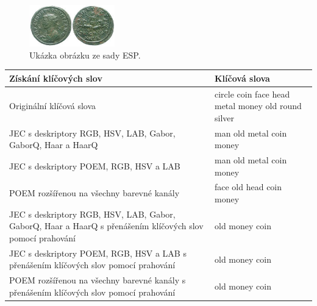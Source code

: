 \documentclass[czech,BP]{thesiskiv}
\begin{document}
\begin{figure}[H]
	\centering
	\includegraphics[width=140px]{./img/esp_86743.jpg}	
	\caption{Ukázka obrázku ze sady ESP.}
	\label{img:esp_coin}
\end{figure}

\begin{center}
	\begin{tabular}{| p{7cm} | p{7cm} |}
		\hline
		\textbf{Získání klíčových slov} & \textbf{Klíčová slova} \\ \hline
		Originální klíčová slova & circle coin face head metal money old round silver \\ \hline
		JEC s deskriptory RGB, HSV, LAB, Gabor, GaborQ, Haar a HaarQ & man old metal coin money \\ \hline
		JEC s deskriptory POEM, RGB, HSV a LAB & man old metal coin money  \\ \hline 
		POEM rozšířenou na všechny barevné kanály & face old head coin money \\ \hline 
		JEC s deskriptory RGB, HSV, LAB, Gabor, GaborQ, Haar a HaarQ s přenášením klíčových slov pomocí prahování & old money coin \\ \hline 
		JEC s deskriptory POEM, RGB, HSV a LAB s přenášením klíčových slov pomocí prahování & old money coin \\ \hline
		POEM rozšířenou na všechny barevné kanály s přenášením klíčových slov pomocí prahování & old money coin\\ \hline 
			
	\end{tabular}
\end{center}
	 
\end{document}
